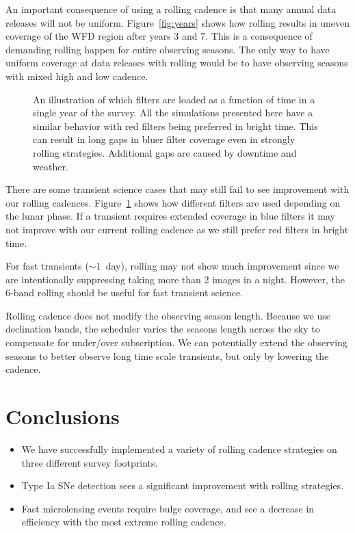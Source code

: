 \documentclass[modern]{aastex62}
\begin{document}
An important consequence of using a rolling cadence is that many annual data releases will not be uniform. Figure~\ref{fig:years} shows how rolling results in uneven coverage of the WFD region after years 3 and 7. This is a consequence of demanding rolling happen for entire observing seasons. The only way to have uniform coverage at data releases with rolling would be to have observing seasons with mixed high and low cadence.



\begin{figure}
\caption{An illustration of which filters are loaded as a function of time in a single year of the survey. All the simulations presented here have a similar behavior with red filters being preferred in bright time. This can result in long gaps in bluer filter coverage even in strongly rolling strategies. Additional gaps are caused by downtime and weather. \label{fig:hour}}
\end{figure}

There are some transient science cases that may still fail to see improvement with our rolling cadences. Figure~\ref{fig:hour} shows how different filters are used depending on the lunar phase. If a transient requires extended coverage in blue filters it may not improve with our current rolling cadence as we still prefer red filters in bright time.

For fast transients ($\sim 1$\ day), rolling may not show much improvement since we are intentionally suppressing taking more than 2 images in a night. However, the 6-band rolling should be useful for fast transient science.

Rolling cadence does not modify the observing season length. Because we use declination bands, the scheduler varies the seasons length across the sky to compensate for under/over subscription. We can potentially extend the observing seasons to better observe long time scale transients, but only by lowering the cadence.



\section{Conclusions}

\begin{itemize}
    \item{We have successfully implemented a variety of rolling cadence strategies on three different survey footprints.}
    \item{Type Ia SNe detection sees a significant improvement with rolling strategies.}
    \item{Fast microlensing events require bulge coverage, and see a decrease in efficiency with the most extreme rolling cadence.}
\end{itemize}
\end{document}
